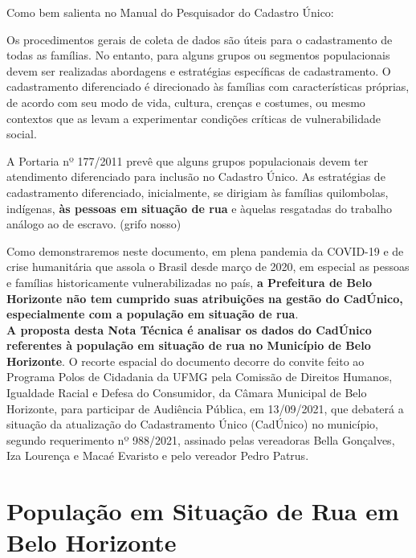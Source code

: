 \documentclass[12pt]{article}
\begin{document}
Como bem salienta \citep{cadunico} no Manual do Pesquisador do Cadastro Único:

\begin{trivlist}\leftskip=2.5cm
\item Os procedimentos gerais de coleta de dados são úteis para o cadastramento de todas as famílias. No entanto, para alguns grupos ou segmentos populacionais devem ser realizadas abordagens e estratégias específicas de cadastramento. O cadastramento diferenciado é direcionado às famílias com características próprias, de acordo com seu modo de vida, cultura, crenças e costumes, ou mesmo contextos que as levam a experimentar condições críticas de vulnerabilidade social.
 \vspace{0.5cm}
\item A Portaria nº 177/2011 prevê que alguns grupos populacionais devem ter atendimento diferenciado para inclusão no Cadastro Único. As estratégias de cadastramento diferenciado, inicialmente, se dirigiam às famílias quilombolas, indígenas, \textbf{às pessoas em situação de rua} e àquelas resgatadas do trabalho análogo ao de escravo. \citep[p.~63]{cadunico} (grifo nosso)
\end{trivlist}


Como demonstraremos neste documento, em plena pandemia da COVID-19 e de crise humanitária que assola o Brasil desde março de 2020, em especial as pessoas e famílias historicamente vulnerabilizadas no país, \textbf{a Prefeitura de Belo Horizonte não tem cumprido suas atribuições na gestão do CadÚnico, especialmente com a população em situação de rua}.\\ 

\textbf{A proposta desta Nota Técnica é analisar os dados do CadÚnico referentes à população em situação de rua no Município de Belo Horizonte}. O recorte espacial do documento decorre do convite feito ao Programa Polos de Cidadania da UFMG pela Comissão de Direitos Humanos, Igualdade Racial e Defesa do Consumidor, da Câmara Municipal de Belo Horizonte, para participar de Audiência Pública, em 13/09/2021, que debaterá a situação da atualização do Cadastramento Único (CadÚnico) no município, segundo requerimento nº 988/2021, assinado pelas vereadoras Bella Gonçalves, Iza Lourença e Macaé Evaristo e pelo vereador Pedro Patrus.\\

\newpage

\section{População em Situação de Rua em Belo Horizonte}
\label{pop_rua_bh}
\vspace{1cm}
\end{document}
